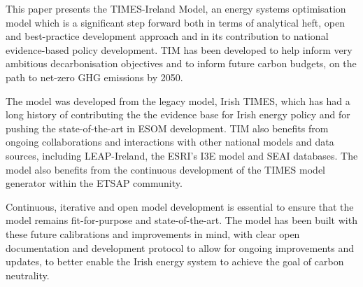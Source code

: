 \documentclass[gmd,manuscript]{copernicus}
\begin{document}
\conclusions  %
\label{s:conclusion}
This paper presents the TIMES-Ireland Model, an energy systems optimisation model which is a significant step forward both in terms of analytical heft, open and best-practice development approach and in its contribution to national evidence-based policy development. TIM has been developed to help inform very ambitious decarbonisation objectives and to inform future carbon budgets, on the path to net-zero GHG emissions by 2050. 

The model was developed from the legacy model, Irish TIMES, which has had a long history of contributing the the evidence base for Irish energy policy and for pushing the state-of-the-art in ESOM development. TIM also benefits from ongoing collaborations and interactions with other national models and data sources, including LEAP-Ireland, the ESRI's I3E model and SEAI databases. The model also benefits from the continuous development of the TIMES model generator within the ETSAP community.

Continuous, iterative and open model development is essential to ensure that the model remains fit-for-purpose and state-of-the-art. The model has been built with these future calibrations and improvements in mind, with clear open documentation and development protocol to allow for ongoing improvements and updates, to better enable the Irish energy system to achieve the goal of carbon neutrality. 










\end{document}
